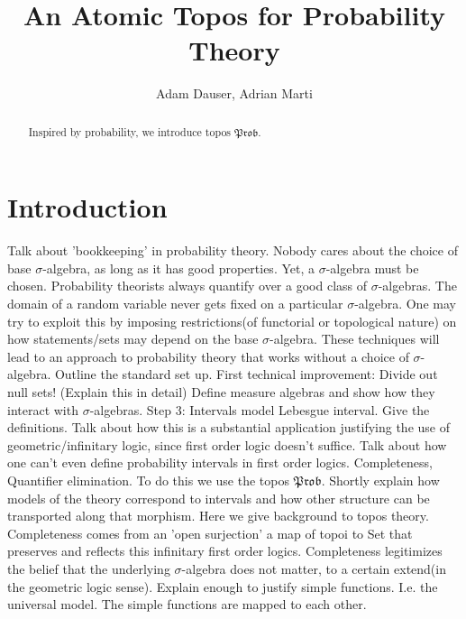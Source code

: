 \documentclass[a4paper]{amsproc}
\title{\textbf{An Atomic Topos for Probability Theory}}
\author{Adam Dauser, Adrian Marti}
\date{}
\theoremstyle{plain}
\theoremstyle{definition}
\theoremstyle{remark}
\numberwithin{equation}{section}
\begin{document}
\begin{center}
\begin{minipage}{\textwidth}
\begin{abstract}
Inspired by probability, we introduce topos $\mathfrak{Prob}$. %
\end{abstract}

\maketitle
\end{minipage}
\end{center}
\tableofcontents 
\section{Introduction}
Talk about 'bookkeeping' in probability theory. Nobody cares about the choice of base $\sigma$-algebra, as long as it has good properties. Yet, a $\sigma$-algebra must be chosen. Probability theorists always quantify over a good class of $\sigma$-algebras. The domain of a random variable never gets fixed on a particular $\sigma$-algebra. One may try to exploit this by imposing restrictions(of functorial or topological nature) on how statements/sets may depend on the base $\sigma$-algebra. These techniques will lead to an approach to probability theory that works without a choice of $\sigma$-algebra. Outline the standard set up.\newline
\indent First technical improvement: Divide out null sets! (Explain this in detail) Define measure algebras and show how they interact with $\sigma$-algebras. \newline
\indent Step 3:  Intervals model Lebesgue interval. Give the definitions.
\newline
\indent Talk about how this is a substantial application justifying the use of geometric/infinitary logic, since first order logic doesn't suffice. Talk about how one can't even define probability intervals in first order logics. Completeness, Quantifier elimination.\newline
\indent To do this we use the topos $\mathfrak{Prob}$. Shortly explain how models of the theory correspond to intervals and how other structure can be transported along that morphism. Here we give background to topos theory. Completeness comes from an 'open surjection' a map of topoi to Set that preserves and reflects this infinitary first order logics. Completeness legitimizes the belief that the underlying $\sigma$-algebra does not matter, to a certain extend(in the geometric logic sense). Explain enough to justify simple functions. I.e. the universal model. The simple functions are mapped to each other.
\end{document}
